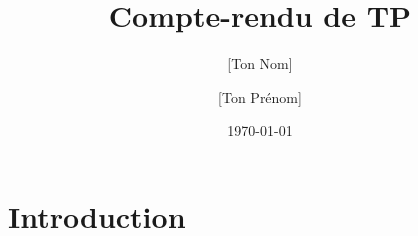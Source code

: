 \documentclass{article}
\begin{document}
\title{Compte-rendu de TP}
\author{[Ton Nom] \and [Ton Prénom]}
\date{\today}

\maketitle

\section{Introduction}
\end{document}
